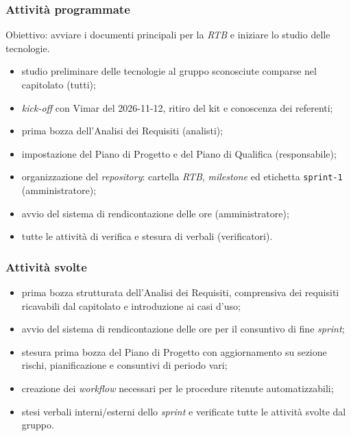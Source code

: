 \documentclass[11pt, a4paper]{article}
\begin{document}
	\subsubsection{Attività programmate}
	Obiettivo: avviare i documenti principali per la \textit{RTB} e iniziare lo studio delle tecnologie.
	\begin{itemize}
		\item studio preliminare delle tecnologie al gruppo sconosciute comparse nel capitolato (tutti);
		\item \textit{kick-off} con Vimar del 2026-11-12, ritiro del kit e conoscenza dei referenti;
		\item prima bozza dell'Analisi dei Requisiti (analisti);
		\item impostazione del Piano di Progetto e del Piano di Qualifica (responsabile);
		\item organizzazione del \textit{repository}: cartella \textit{RTB}, \textit{milestone} ed etichetta \texttt{sprint-1} (amministratore);
		\item avvio del sistema di rendicontazione delle ore (amministratore);
		\item tutte le attività di verifica e stesura di verbali (verificatori).
	\end{itemize}
	
	
	\subsubsection{Attività svolte}
	\begin{itemize}
		\item prima bozza strutturata dell'Analisi dei Requisiti, comprensiva dei requisiti ricavabili dal capitolato e introduzione ai casi d'uso;
		\item avvio del sistema di rendicontazione delle ore per il consuntivo di fine \textit{sprint};
		\item stesura prima bozza del Piano di Progetto con aggiornamento su sezione rischi, pianificazione e consuntivi di periodo vari;
		\item creazione dei \textit{workflow} necessari per le procedure ritenute automatizzabili;
		\item stesi verbali interni/esterni dello \textit{sprint} e verificate tutte le attività svolte dal gruppo.
	\end{itemize}
	
\end{document}
